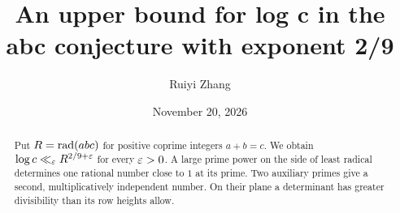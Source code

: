 \documentclass[11pt]{amsart}
\title[An upper bound for log c]{An upper bound for log c in the abc conjecture with exponent 2/9}
\author{Ruiyi Zhang}
\date{November 20, 2026}
\numberwithin{equation}{section}
\begin{document}
\begin{abstract}
Put $R=\operatorname{rad}(abc)$ for positive coprime integers $a+b=c$.
We obtain $\log c\ll_\varepsilon R^{2/9+\varepsilon}$ for every $\varepsilon>0$.
A large prime power on the side of least radical determines one rational
number close to $1$ at its prime. Two auxiliary primes give a second,
multiplicatively independent number. On their plane a determinant has
greater divisibility than its row heights allow.
\end{abstract}
\maketitle











\end{document}
